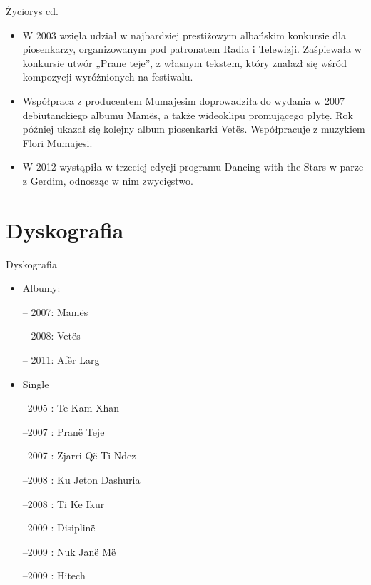 \documentclass{beamer}
\begin{document}
\begin{frame}{Życiorys cd.}
\begin {itemize}
\item<1> W 2003 wzięła udział w najbardziej prestiżowym albańskim konkursie dla piosenkarzy, organizowanym pod patronatem Radia i Telewizji. Zaśpiewała w konkursie utwór „Prane teje”, z własnym tekstem, który znalazł się wśród kompozycji wyróżnionych na festiwalu.
\pause
\item<1-3> Współpraca z producentem Mumajesim doprowadziła do wydania w 2007 debiutanckiego albumu Mamës, a także wideoklipu promującego płytę. Rok później ukazał się kolejny album piosenkarki Vetës. Współpracuje z muzykiem Flori Mumajesi.
\item<3> W 2012 wystąpiła w trzeciej edycji programu Dancing with the Stars w parze z Gerdim, odnosząc w nim zwycięstwo.
\end {itemize}
\end {frame}

\section{Dyskografia}
\begin{frame}{Dyskografia}
\begin {itemize}

\item Albumy:

-- 2007: Mamës

-- 2008: Vetës

-- 2011: Afër Larg
\pause

\item Single

--2005 : Te Kam Xhan

--2007 : Pranë Teje

--2007 : Zjarri Që Ti Ndez

--2008 : Ku Jeton Dashuria

--2008 : Ti Ke Ikur

--2009 : Disiplinë

--2009 : Nuk Janë Më

--2009 : Hitech

\end {itemize}
\end {frame}
\end{document}
